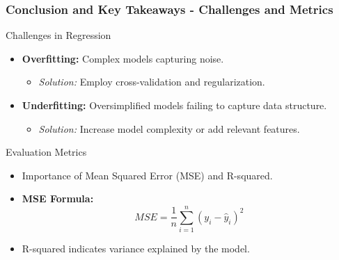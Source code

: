 \documentclass[aspectratio=169]{beamer}
\begin{document}
\begin{frame}[fragile]
    \frametitle{Conclusion and Key Takeaways - Challenges and Metrics}
    
    \begin{block}{Challenges in Regression}
        \begin{itemize}
            \item \textbf{Overfitting:} Complex models capturing noise.
            \begin{itemize}
                \item \textit{Solution:} Employ cross-validation and regularization.
            \end{itemize}
            \item \textbf{Underfitting:} Oversimplified models failing to capture data structure.
            \begin{itemize}
                \item \textit{Solution:} Increase model complexity or add relevant features.
            \end{itemize}
        \end{itemize}
    \end{block}
    
    \begin{block}{Evaluation Metrics}
        \begin{itemize}
            \item Importance of Mean Squared Error (MSE) and R-squared.
            \item \textbf{MSE Formula:} 
            \begin{equation}
                MSE = \frac{1}{n}\sum_{i=1}^{n}(y_i - \hat{y}_i)^2
            \end{equation}
            \item R-squared indicates variance explained by the model.
        \end{itemize}
    \end{block}
\end{frame}
\end{document}
